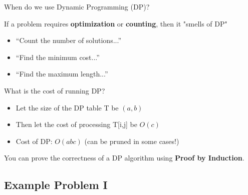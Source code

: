 \begin{frame}{When do we use Dynamic Programming (DP)?}

  \begin{block}{If a problem requires {\bf optimization} or {\bf counting}, then it "smells of DP"}

    \begin{itemize}
    \item ``Count the number of solutions...''
    \item ``Find the minimum cost...''
    \item ``Find the maximum length...''
    \end{itemize}
  \end{block}

  \begin{exampleblock}{What is the cost of running DP?}
    \begin{itemize}
      \item Let the size of the DP table T be $(a,b)$
      \item Then let the cost of processing T[i,j] be $O(c)$
      \item Cost of DP: $O(abc)$ \hfill(can be pruned in some cases!)
    \end{itemize}
  \end{exampleblock}

  You can prove the correctness of a DP algorithm using {\bf Proof by Induction}.
\end{frame}

\subsection{Example Problem I}

